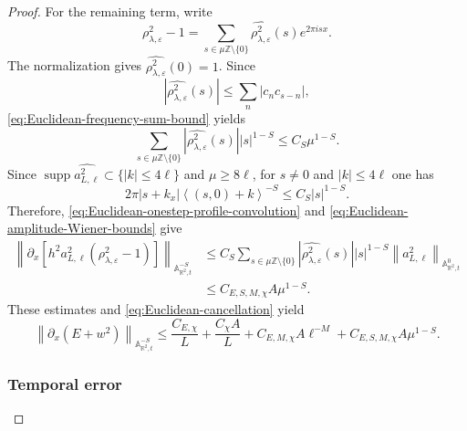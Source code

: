 \documentclass[12pt,reqno,letterpaper]{amsart}
\numberwithin{equation}{section}
\theoremstyle{definition}
\newcommand{\R}{\mathbb R}
\newcommand{\Z}{\mathbb Z}
\newcommand{\A}{\mathbb A}
\newcommand{\eps}{\varepsilon}
\newcommand{\la}{\lambda}
\newcommand{\supp}{\operatorname{supp}}
\newcommand{\norm}[1]{\left\lVert #1\right\rVert}
\newcommand{\abs}[1]{\left\lvert #1\right\rvert}
\begin{document}
\begin{proof}
For the remaining term, write
\[
 \rho_{\la,\eps}^2-1
 =\sum_{s\in\mu\Z\setminus\{0\}}
 \widehat{\rho_{\la,\eps}^2}(s)e^{2\pi isx}.
\]
The normalization gives $\widehat{\rho_{\la,\eps}^2}(0)=1$.  Since
\[
 \abs{\widehat{\rho_{\la,\eps}^2}(s)}
 \leq\sum_n\abs{c_nc_{s-n}},
\]
\eqref{eq:Euclidean-frequency-sum-bound} yields
\begin{equation}\label{eq:Euclidean-onestep-profile-convolution}
 \sum_{s\in\mu\Z\setminus\{0\}}
 \abs{\widehat{\rho_{\la,\eps}^2}(s)}\abs s^{1-S}
 \leq C_S\mu^{1-S}.
\end{equation}
Since $\supp\widehat{a_{L,\ell}^2}\subset\{\abs k\leq4\ell\}$ and
$\mu\geq8\ell$, for $s\neq0$ and $\abs k\leq4\ell$ one has
\[
 2\pi\abs{s+k_x}\left\langle(s,0)+k\right\rangle^{-S}
 \leq C_S\abs s^{1-S}.
\]
Therefore, \eqref{eq:Euclidean-onestep-profile-convolution} and
\eqref{eq:Euclidean-amplitude-Wiener-bounds} give
\begin{align*}
 \norm{\partial_x\left[
 h^2a_{L,\ell}^2(\rho_{\la,\eps}^2-1)\right]}
 _{\A^{-S}_{\R^2,t}}
 &\leq C_S\sum_{s\in\mu\Z\setminus\{0\}}
 \abs{\widehat{\rho_{\la,\eps}^2}(s)}\abs s^{1-S}
 \norm{a_{L,\ell}^2}_{\A^0_{\R^2,t}}\\
 &\leq C_{E,S,M,\chi}A\mu^{1-S}.
\end{align*}
These estimates and \eqref{eq:Euclidean-cancellation} yield
\begin{equation}\label{eq:Euclidean-onestep-oscillation}
 \norm{\partial_x(E+w^2)}_{\A^{-S}_{\R^2,t}}
 \leq\frac{C_{E,\chi}}{L}+\frac{C_\chi A}{L}
 +C_{E,M,\chi}A\ell^{-M}+C_{E,S,M,\chi}A\mu^{1-S}.
\end{equation}

\subsubsection*{Temporal error}


\end{proof}
\end{document}
